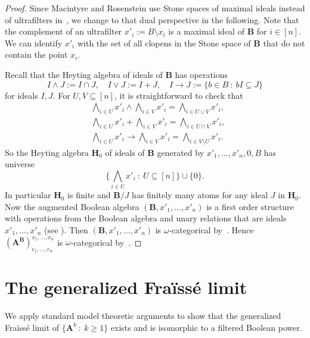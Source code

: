 \documentclass[12pt,a4paper,reqno]{amsart}
\numberwithin{equation}{section}
\theoremstyle{plain}
\theoremstyle{definition}
\newcommand{\ABxe}{(\mathbf{A^B})^{x_1,\dots,x_n}_{e_1,\dots,e_n}}
\newcommand{\B}{\mathbf{B}}
\renewcommand{\H}{\mathbf{H}}
\newcommand{\st}{\: :\:}
\begin{document}
\begin{proof}
Since Macintyre and Rosenstein use Stone spaces of maximal ideals instead of ultrafilters in~\cite{MR:CRN}, 
 we change to that dual perspective in the following.
 Note that the complement of an ultrafilter $x'_i := B\setminus x_i$ is a maximal ideal of $\B$ for $i\in [n]$.
 We can identify $x'_i$ with the set of all clopens in the Stone space of $\B$ that do not contain the point $x_i$.

Recall that the Heyting algebra of ideals of $\B$ has operations
\[ I\wedge J := I\cap J,  \quad I\vee J := I+J, \quad I\rightarrow J := \{b\in B \st bI \subseteq J \} \] 
 for ideals $I,J$. For $U,V\subseteq [n]$, it is straightforward to check that
\begin{align*}
  & \bigwedge_{i\in U} x'_i   \wedge  \bigwedge_{i\in V} x'_i  = \bigwedge_{i\in U\cup V} x'_i, \\
  & \bigwedge_{i\in U} x'_i   +  \bigwedge_{i\in V} x'_i  = \bigwedge_{i\in U\cap V} x'_i, \\
  & \bigwedge_{i\in U} x'_i \rightarrow  \bigwedge_{i\in V} x'_i  = \bigwedge_{i\in V\setminus U} x'_i.
\end{align*}
 So the Heyting algebra $\H_0$ of ideals of $\B$ generated by $x'_1,\dots,x'_n,0,B$ has universe
\[ \{ \bigwedge_{i\in U} x'_{i} \st U\subseteq [n] \} \cup \{0\}. \]
In particular $\H_0$ is finite and $\B/J$ has finitely many atoms for any ideal $J$ in $\H_0$.
 Now the augmented Boolean algebra $(\B,x'_1,\dots,x'_n)$ is a first order structure
 with operations from the Boolean algebra and unary relations that are ideals $x'_1,\dots,x'_n$ (see \cite[p. 137]{MR:CRN}).
 Then $(\B,x'_1,\dots,x'_n)$ is $\omega$-categorical by~\cite[Theorem~7]{MR:CRN}.
 Hence $\ABxe$ is $\omega$-categorical by~\cite[Theorem~5]{MR:CRN}.
\end{proof} 


\section{The  generalized Fra{\"i}ss{\'e} limit} \label{sec:Flim}

We apply standard model theoretic arguments to show that the generalized Fra{\"i}ss{\'e} limit of
$\{\mathbf{A}^k \st k\geq 1\}$ exists and is isomorphic to a filtered Boolean power.
\end{document}
